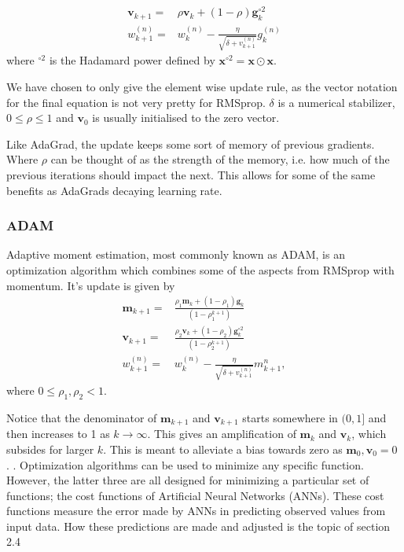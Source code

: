 \documentclass{article}
\theoremstyle{definition}
\begin{document}
\begin{align*}
    \boldsymbol{v}_{k+1} =& \rho \boldsymbol{v}_{k} + (1-\rho) \boldsymbol{g}_k^{\circ 2}\\
    w_{k+1}^{(n)} =& w_k^{(n)} - \frac{\eta}{  \sqrt{\delta + v_{k+1}^{(n)}}} g_k^{(n)}
\end{align*}
where $^{\circ 2}$ is the Hadamard power defined by $\boldsymbol{x}^{\circ 2} = \boldsymbol{x} \odot \boldsymbol{x}$.

We have chosen to only give the element wise update rule, as the vector notation for the final equation is not very pretty for RMSprop. $\delta$ is a numerical stabilizer, $0 \leq \rho \leq 1$ and $\boldsymbol{v}_0$ is usually initialised to the zero vector.

Like AdaGrad, the update keeps some sort of memory of previous gradients. Where $\rho$ can be thought of as the strength of the memory, i.e. how much of the previous iterations should impact the next. This allows for some of the same benefits as AdaGrads decaying learning rate.

\subsubsection{ADAM}
Adaptive moment estimation, most commonly known as ADAM, is an optimization algorithm which combines some of the aspects from RMSprop with momentum. It's update is given by
\begin{align*}
    \boldsymbol{m}_{k+1} =& \frac{\rho_1 \boldsymbol{m}_k + (1- \rho_1) \boldsymbol{g}_k}{\left(1 - \rho_1^{k+1}\right)}\\
    \boldsymbol{v}_{k+1} =& \frac{\rho_2 \boldsymbol{v}_k + (1-\rho_2) \boldsymbol{g}_k^{\circ 2}}{\left(1-\rho_2^{k+1}\right)}\\
    w_{k+1}^{(n)} =& w_k^{(n)} - \frac{\eta}{ \sqrt{\delta+v_{k+1}^{(n)}}} m_{k+1}^{n},
\end{align*}
where $0 \leq \rho_1,\rho_2 < 1$.

Notice that the denominator of $\boldsymbol{m}_{k+1}$ and $\boldsymbol{v}_{k+1}$ starts somewhere in $(0,1]$ and then increases to 1 as $k \to \infty$. This gives an amplification of $\boldsymbol{m}_k$ and $\boldsymbol{v}_k$, which subsides for larger $k$. This is meant to alleviate a bias towards zero as $\boldsymbol{m}_0, \boldsymbol{v}_0 = 0$ \parencite[Section 3]{kingma2014adam}.
\label{AdamAmp}.
Optimization algorithms can be used to minimize any specific function. However, the latter three are all designed for minimizing a particular set of functions; the cost functions of Artificial Neural Networks (ANNs). These cost functions measure the error made by ANNs in predicting observed values from input data. How these predictions are made and adjusted is the topic of section 2.4
\end{document}
